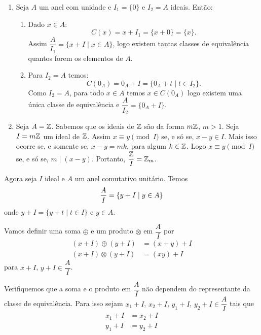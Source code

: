 \begin{exemplos}
	\begin{enumerate}[label={\arabic*})]
		\item Seja $A$ um anel com unidade e $I_{1} = \{0\}$ e $I_{2} = A$ ideais. Ent\~ao:
		\begin{enumerate}[label={\roman*})]
		\item Dado $x \in A$:
		\[
			C(x) = x + I_{1} = \{x + 0\} = \{x\}.
		\]
		Assim $\dfrac{A}{I_{1}} = \{x + I \mid x \in A\}$, logo existem tantas classes de equival{\^e}ncia quantos forem os elementos de $A$.

		\item Para $I_{2} = A$ temos:
		\[
			C(0_A) = 0_A + I = \{0_A + t \mid t \in I_{2}\}.
		\]
		Como $I_2 = A$, para todo $x \in A$ temos $x \in C(0_A)$ logo existem uma \'unica classe de equival\^encia
		e $\dfrac{A}{I_{2}} = \{0_{A} + I\}$.
	\end{enumerate}

	\item Seja $A = \mathbb{Z}$. Sabemos que os ideais de $\mathbb{Z}$ s{\~a}o da forma $m\mathbb{Z}$, $m > 1$. Seja $I = m\mathbb{Z}$ um ideal de $\mathbb{Z}$. Assim $x\equiv y \pmod I$ se, e s\'o se, $x - y \in I$. Mais isso ocorre se, e somente se, $x - y = mk $, para algum $k \in \mathbb{Z}$. Logo $x\equiv y \pmod I$ se, e s\'o se, $m\mid (x - y)$. Portanto, $\dfrac{\mathbb{Z}}{I} = \mathbb{Z}_m$.
	\end{enumerate}
\end{exemplos}


Agora seja $I$ ideal e $A$ um anel comutativo unitário. Temos
\[
	\dfrac{A}{I} = \{y + I \mid y \in A\}\\
\]
onde $y + I = \{y + t \mid t \in I\}$ e $y \in A$.

Vamos definir uma soma $\oplus$ e um produto $\otimes$ em $\dfrac{A}{I}$ por
\begin{align*}
	(x + I)\oplus(y + I) &= (x + y) + I\\
	(x + I)\otimes(y + I) &= (xy) + I
\end{align*}
para $x + I$, $y + I \in \dfrac{A}{I}$.

Verifiquemos que a soma e o produto em $\dfrac{A}{I}$ n{\~a}o dependem do representante da classe de equival{\^e}ncia.
Para isso sejam $x_1 + I$, $x_2 + I$, $y_1 + I$, $y_2 + I \in \dfrac{A}{I}$ tais que
\begin{align*}
	x_1 + I &= x_2 + I\\
	y_1 + I &= y_2 + I
\end{align*}

